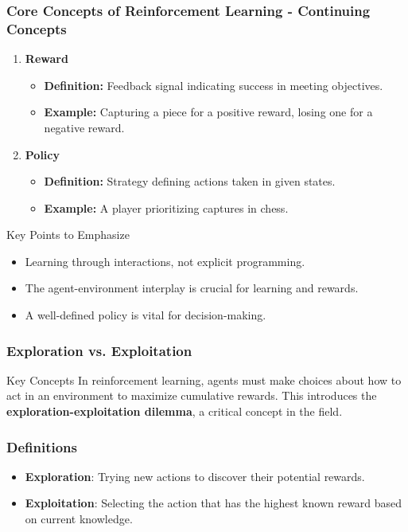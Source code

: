 \documentclass[aspectratio=169]{beamer}
\begin{document}
\begin{frame}[fragile]
    \frametitle{Core Concepts of Reinforcement Learning - Continuing Concepts}
    \begin{enumerate}[resume]
        \item \textbf{Reward}
        \begin{itemize}
            \item \textbf{Definition:} Feedback signal indicating success in meeting objectives.
            \item \textbf{Example:} Capturing a piece for a positive reward, losing one for a negative reward.
        \end{itemize}
        
        \item \textbf{Policy}
        \begin{itemize}
            \item \textbf{Definition:} Strategy defining actions taken in given states.
            \item \textbf{Example:} A player prioritizing captures in chess.
        \end{itemize}
    \end{enumerate}
    
    \begin{block}{Key Points to Emphasize}
        \begin{itemize}
            \item Learning through interactions, not explicit programming.
            \item The agent-environment interplay is crucial for learning and rewards.
            \item A well-defined policy is vital for decision-making.
        \end{itemize}
    \end{block}
\end{frame}

\begin{frame}[fragile]
    \frametitle{Exploration vs. Exploitation}
    \begin{block}{Key Concepts}
        In reinforcement learning, agents must make choices about how to act in an environment to maximize cumulative rewards.
        This introduces the \textbf{exploration-exploitation dilemma}, a critical concept in the field.
    \end{block}
\end{frame}

\begin{frame}[fragile]
    \frametitle{Definitions}
    \begin{itemize}
        \item \textbf{Exploration}: Trying new actions to discover their potential rewards. 
        \item \textbf{Exploitation}: Selecting the action that has the highest known reward based on current knowledge.
    \end{itemize}
\end{frame}
\end{document}
